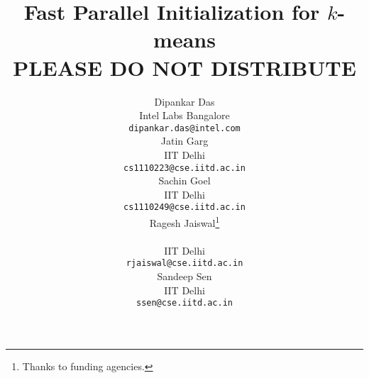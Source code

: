 \documentclass{article} %
\title{Fast Parallel Initialization for $k$-means \\
\tiny{PLEASE DO NOT DISTRIBUTE}}
\author{
Dipankar Das\\
Intel Labs Bangalore\\
\texttt{dipankar.das@intel.com} \\
\And
Jatin Garg \\
IIT Delhi \\
\texttt{cs1110223@cse.iitd.ac.in} \\
\AND
Sachin Goel \\
IIT Delhi \\
\texttt{cs1110249@cse.iitd.ac.in} \\
\And
Ragesh Jaiswal\thanks{Thanks to funding agencies.} \\\\
IIT Delhi \\
\texttt{rjaiswal@cse.iitd.ac.in} \\
\And
Sandeep Sen \\
IIT Delhi \\
\texttt{ssen@cse.iitd.ac.in}
}
\begin{document}
\maketitle

\begin{abstract}

\end{abstract}







\vspace{-0.2in}






{\footnotesize }
\end{document}
